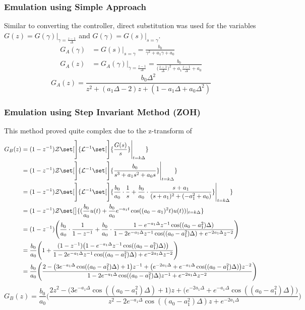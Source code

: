 \documentclass[11pt]{article}
\DeclarePairedDelimiter\set\{\}
\begin{document}
\subsubsection{Emulation using Simple Approach}
Similar to converting the controller, direct substitution was used for the variables $G(z) = G(\gamma)|_{\gamma = \frac{z - 1}{\Delta}}$ and $G(\gamma) = G(s)|_{s = \gamma}$.
\begin{align*}
    G_A(\gamma) &= G(s)|_{s = \gamma} = \frac{b_0}{\gamma^2 + a_1 \gamma + a_0}\\
    G_A(z) &= G_A(\gamma)|_{\gamma = \frac{z-1}{\Delta} } = \frac{b_0}{\big(\frac{z-1}{\Delta}\big)^2 + a_1 \frac{z-1}{\Delta} + a_0}
\end{align*}
\begin{equation}\label{eq:GAz}
    G_A(z)= \frac{b_0 \Delta^2}{z^2 + (a_1 \Delta -2)z + (1 - a_1 \Delta + a_0 \Delta^2)}
\end{equation}
\subsubsection{Emulation using Step Invariant Method (ZOH)}
This method proved quite complex due to the z-transform of 
\begin{align*}
    G_B(z) &= (1 - z^{-1}) \mathcal{Z} \set[\Bigg]{ \mathcal{L}^{-1} \set[\Bigg]{\frac{G(s)}{s}} \Biggr|_{t=k\Delta} }\\
    &= (1 - z^{-1}) \mathcal{Z} \set[\Bigg]{ \mathcal{L}^{-1} \set[\Bigg]{\frac{b_0}{s^3 + a_1 s^2 + a_0 s}} \Biggr|_{t=k\Delta} }\\
    &= (1 - z^{-1}) \mathcal{Z} \set[\Bigg]{ \mathcal{L}^{-1} \set[\Bigg]{\frac{b_0}{a_0}\cdot\frac{1}{s} + \frac{b_0}{a_0}\cdot\frac{s + a_1}{(s+a_1)^2 + (-a_1^2 + a_0)}} \Biggr|_{t=k\Delta} }\\
    &= (1 - z^{-1}) \mathcal{Z} \set[\big]{ ( \frac{b_0}{a_0}u(t) + \frac{b_0}{a_0} e^{-a_1 t}\cos((a_0 - a_1)^2 t)u(t) ) |_{t=k\Delta} }\\
    &= (1 - z^{-1}) \Biggr(\frac{b_0}{a_0}\cdot\frac{1}{1-z^{-1}} + \frac{b_0}{a_0}\cdot\frac{1 - e^{-a_1 \Delta}z^{-1}\cos((a_0 - a_1^2)\Delta)}{1 - 2e^{-a_1 \Delta}z^{-1}\cos((a_0 - a_1^2)\Delta) + e^{-2a_1 \Delta}z^{-2}} \Biggr)\\
    &= \frac{b_0}{a_0} \Biggr( 1 + \frac{(1 - z^{-1})\big(1 - e^{-a_1 \Delta}z^{-1}\cos((a_0 - a_1^2)\Delta)\big)}{1 - 2e^{-a_1 \Delta}z^{-1}\cos((a_0 - a_1^2)\Delta) + e^{-2a_1 \Delta}z^{-2}} \Biggr)\\
    &= \frac{b_0}{a_0} \Biggr(\frac{2 - \big(3e^{-a_1 \Delta}\cos((a_0 - a_1^2)\Delta) + 1 \big)z^{-1} + \big(e^{-2a_1 \Delta} + e^{-a_1 \Delta}\cos((a_0 - a_1^2)\Delta)\big)z^{-2}}{1 - 2e^{-a_1 \Delta}\cos((a_0 - a_1^2)\Delta)z^{-1} + e^{-2a_1 \Delta}z^{-2}} \Biggr)
\end{align*}
\begin{equation}\label{eq:GBz}
    G_B(z)= \frac{b_0}{a_0} \Biggr(\frac{2z^2 - \big(3e^{-a_1 \Delta}\cos((a_0 - a_1^2)\Delta) + 1 \big)z + \big(e^{-2a_1 \Delta} + e^{-a_1 \Delta}\cos((a_0 - a_1^2)\Delta)\big)}{z^2 - 2e^{-a_1 \Delta}\cos((a_0 - a_1^2)\Delta)z + e^{-2a_1 \Delta}} \Biggr)
\end{equation}
\end{document}
